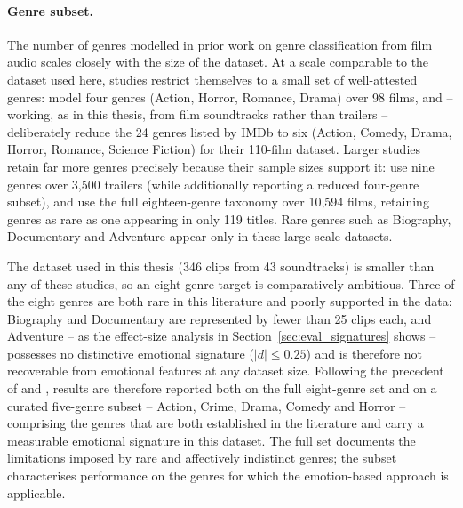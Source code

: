 
\paragraph{Genre subset.}
The number of genres modelled in prior work on genre classification from film audio
scales closely with the size of the dataset. At a scale comparable to the dataset used
here, studies restrict themselves to a small set of well-attested genres:
\citet{austin2010characterization} model four genres (Action, Horror, Romance, Drama)
over 98 films, and \citet{ma2021computational} -- working, as in this thesis, from film
soundtracks rather than trailers -- deliberately reduce the 24 genres listed by IMDb to
six (Action, Comedy, Drama, Horror, Romance, Science Fiction) for their 110-film dataset.
Larger studies retain far more genres precisely because their sample sizes support it:
\citet{behrouzi2023multimodal} use nine genres over 3{,}500 trailers (while additionally
reporting a reduced four-genre subset), and \citet{mangolin2020multimodal} use the full
eighteen-genre taxonomy over 10{,}594 films, retaining genres as rare as one appearing in
only 119 titles. Rare genres such as Biography, Documentary and Adventure appear only in
these large-scale datasets.

The dataset used in this thesis (346 clips from 43 soundtracks) is smaller than any of
these studies, so an eight-genre target is comparatively ambitious. Three of the eight
genres are both rare in this literature and poorly supported in the data: Biography and
Documentary are represented by fewer than 25 clips each, and Adventure -- as the
effect-size analysis in Section~\ref{sec:eval_signatures} shows -- possesses no
distinctive emotional signature ($|d|\le0.25$) and is therefore not recoverable from
emotional features at any dataset size. Following the precedent of
\citet{ma2021computational} and \citet{austin2010characterization}, results are therefore
reported both on the full eight-genre set and on a curated five-genre subset -- Action,
Crime, Drama, Comedy and Horror -- comprising the genres that are both established in the
literature and carry a measurable emotional signature in this dataset. The full set
documents the limitations imposed by rare and affectively indistinct genres; the subset
characterises performance on the genres for which the emotion-based approach is applicable.
